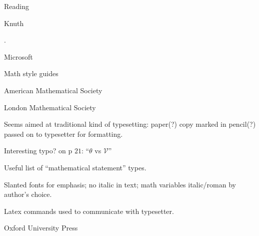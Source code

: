 \documentclass[12pt]{PalisadesLakesBook}
\begin{document}
\begin{plSection}{Reading}
\begin{plSection}{Knuth}



.

\end{plSection}%
\begin{plSection}{Microsoft}


\end{plSection}%
\begin{plSection}{Math style guides}
\begin{plSection}{American Mathematical Society}



\end{plSection}%
\begin{plSection}{London Mathematical Society}


Seems aimed at traditional kind of typesetting:
paper(?) copy marked in pencil(?)  
passed on to typesetter for formatting.

Interesting typo? on p $21$: ``$\theta$ vs $\mathscr{V}$''

Useful list of ``mathematical statement'' types.

Slanted fonts for emphasis; no italic in text;
math variables italic/roman by author's choice.

Latex commands used to communicate with typesetter.


\end{plSection}%
\begin{plSection}{Oxford University Press}



\end{plSection}
\end{plSection}
\end{plSection}
\end{document}
